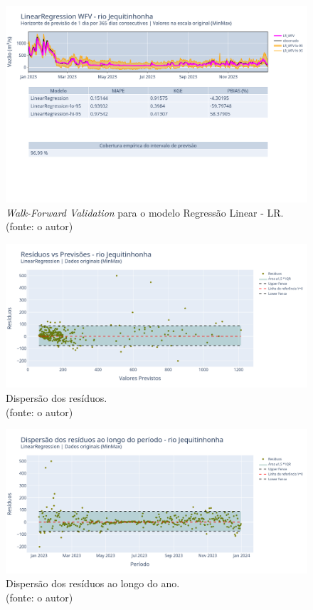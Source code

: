 \begin{figure}[!h]
\centering
\includegraphics[scale=0.33]{Figuras/jequiti/wfv/LR/LR_WFV_ORIG.png}
\caption{\textit{Walk-Forward Validation} para o modelo Regressão Linear - LR.\\(fonte: o autor)}
\label{fig:jequiti_LR_WFV_ORIG}
\end{figure}

\begin{figure}[!h]
\centering
\includegraphics[scale=0.33]{Figuras/jequiti/wfv/LR/LR_WFV_ORIG_RESID_x_PREV.png}
\caption{Dispersão dos resíduos.\\(fonte: o autor)}
\label{fig:jequiti_LR_WFV_ORIG_RESID_x_PREV}
\end{figure}

\begin{figure}[!h]
\centering
\includegraphics[scale=0.33]{Figuras/jequiti/wfv/LR/LR_WFV_ORIG_RESID_x_TEMPO.png}
\caption{Dispersão dos resíduos ao longo do ano.\\(fonte: o autor)}
\label{fig:jequiti_LR_WFV_ORIG_RESID_x_TEMPO}
\end{figure}

